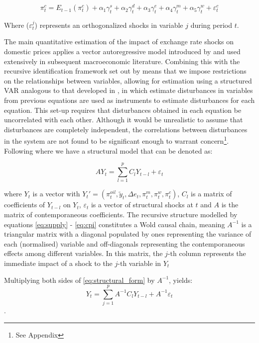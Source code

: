 \documentclass[12pt]{article}
\begin{document}
\begin{equation}\label{eq:cpi}
\pi_t^c = E_{t-1}(\pi_t^c) + \alpha_{1}\gamma_t^s + \alpha_{2}\gamma_t^d + \alpha_{3}\gamma_t^e + \alpha_{4}\gamma_t^m + \alpha_{5}\gamma_t^w +\varepsilon_t^c
\end{equation}

Where ($\varepsilon_t^j$) represents an orthogonalized shocks in variable $j$ during period $t$. 

The main quantitative estimation of the impact of exchange rate shocks on domestic prices applies a vector autoregressive model introduced by \textcite{sims1980} and used extensively in subsequent macroeconomic literature. Combining this with the recursive identification framework set out by \cite{mccarthy1999} means that we impose restrictions on the relationships between variables, allowing for  estimation using a structured VAR analogous to that developed in \textcite{BlanchardWatson1986}, in which estimate disturbances in variables from previous equations are used as instruments to estimate disturbances for each equation. This set-up requires that disturbances obtained in each equation be uncorrelated with each other. Although it would be unrealistic to assume that disturbances are completely independent, the correlations between disturbances in the system are not found to be significant enough to warrant concern\footnote{See Appendix}. Following \textcite{sims1986forecasting} where we have a structural model that can be denoted as:

\begin{equation}\label{eq:structural_form} AY_t =   \sum_{l=1}^{p} C_{l}Y_{t-l} +  \varepsilon_t \end{equation}

where $Y_t$ is a vector with $Y_t' = (\pi^{oil}_{t}, \tilde{y}_{t}, \Delta e_{t}, \pi_t^m, \pi_t^w, \pi_t^c)$, $C_{l}$ is a matrix of coefficients of $Y_{t-l}$ on $Y_t$,  $\varepsilon_t$ is a vector of structural shocks at $t$ and $A$ is the matrix of contemporaneous coefficients. The recursive structure modelled by equations \eqref{eq:supply} - \eqref{eq:cpi} constitutes a Wold causal chain, meaning $A^{-1}$ is a triangular matrix with a diagonal populated by ones representing the variance of each (normalised) variable and off-diagonals representing the contemporaneous effects among different variables. In this matrix, the $j$-th column represents the immediate impact of a shock to the $j$-th variable in $Y_t$

Multiplying both sides of \eqref{eq:structural_form} by $A^{-1}$, yields: \begin{equation}\label{eq:reduced_form} Y_t =   \sum_{j=1}^{p}A^{-1}C_{l}Y_{t-l} +  A^{-1}\varepsilon_t \end{equation}. 
\end{document}
